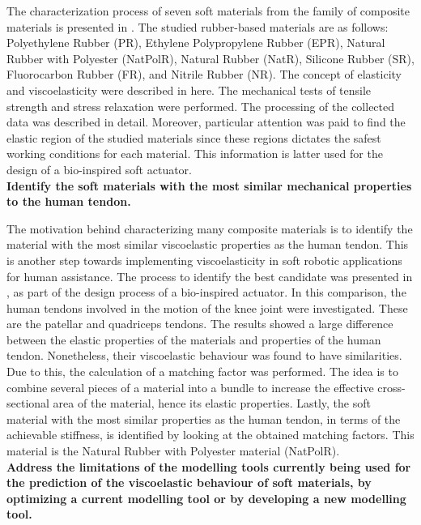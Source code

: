 The characterization process of seven soft materials from the family of composite materials is presented in . The studied rubber-based materials are as follows: Polyethylene Rubber (PR), Ethylene Polypropylene Rubber (EPR), Natural Rubber with Polyester (NatPolR), Natural Rubber (NatR), Silicone Rubber (SR), Fluorocarbon Rubber (FR), and Nitrile Rubber (NR). The concept of elasticity and viscoelasticity were described in here. The mechanical tests of tensile strength and stress relaxation were performed. The processing of the collected data was described in detail. Moreover, particular attention was paid to find the elastic region of the studied materials since these regions dictates the safest working conditions for each material. This information is latter used for the design of a bio-inspired soft actuator.
\\[1em]
\noindent \textbf{\large{ Identify the soft materials with the most similar mechanical properties to the human tendon.}}

The motivation behind characterizing many composite materials is to identify the material with the most similar viscoelastic properties as the human tendon. This is another step towards implementing viscoelasticity in soft robotic applications for human assistance. The process to identify the best candidate was presented in , as part of the design process of a bio-inspired actuator. In this comparison, the human tendons involved in the motion of the knee joint were investigated. These are the patellar and quadriceps tendons. The results showed a large difference between the elastic properties of the materials and properties of the human tendon. Nonetheless, their viscoelastic behaviour was found to have similarities. Due to this, the calculation of a matching factor was performed. The idea is to combine several pieces of a material into a bundle to increase the effective cross-sectional area of the material, hence its elastic properties. Lastly, the soft material with the most similar properties as the human tendon, in terms of the achievable stiffness, is identified by looking at the obtained matching factors. This material is the Natural Rubber with Polyester material (NatPolR).
\\[1em]
\noindent \textbf{\large{ Address the limitations of the modelling tools currently being used for the prediction of the viscoelastic behaviour of soft materials, by optimizing a current modelling tool or by developing a new modelling tool. }}

